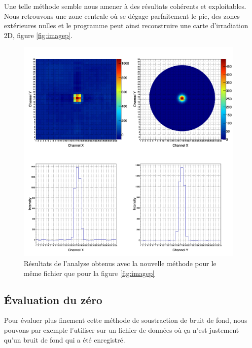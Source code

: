 \documentclass[a4paper,11pt]{article}
\begin{document}
Une telle méthode semble nous amener à des résultats cohérents et exploitables.
Nous retrouvons une zone centrale où se dégage parfaitement le pic, des zones extérieures nulles et le programme peut ainsi reconstruire une carte d'irradiation 2D, figure \ref{fig:imagep}.
\begin{figure}[h]
\begin{center}
\includegraphics[scale=0.4]{Image.png} 
\caption{\label{fig:image}\footnotesize{Résultats de l'analyse obtenus avec la nouvelle méthode pour le même fichier que pour la figure \ref{fig:imagep}}}
\end{center}
\end{figure}

\subsection*{Évaluation du zéro}
Pour évaluer plus finement cette méthode de soustraction de bruit de fond, nous pouvons par exemple l'utiliser sur un fichier de données où ça n'est justement qu'un bruit de fond qui a été enregistré.
\end{document}
